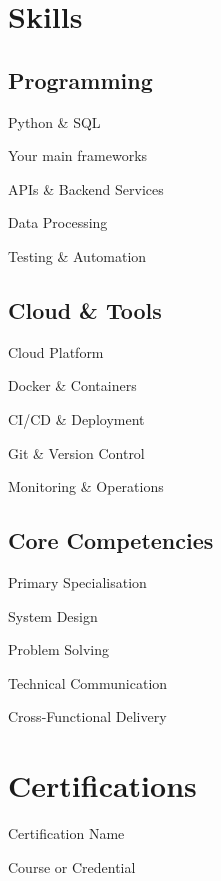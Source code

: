 \documentclass{cv}
\begin{document}
\begin{minipage}[t]{0.31\textwidth}

\section{Skills}

\subsection{Programming}
\begin{tightemize}
  \item Python \& SQL
  \item Your main frameworks
  \item APIs \& Backend Services
  \item Data Processing
  \item Testing \& Automation
\end{tightemize}

\entrysep

\subsection{Cloud \& Tools}
\begin{tightemize}
  \item Cloud Platform
  \item Docker \& Containers
  \item CI/CD \& Deployment
  \item Git \& Version Control
  \item Monitoring \& Operations
\end{tightemize}

\entrysep

\subsection{Core Competencies}
\begin{tightemize}
  \item Primary Specialisation
  \item System Design
  \item Problem Solving
  \item Technical Communication
  \item Cross-Functional Delivery
\end{tightemize}

\section{Certifications}
\begin{tightemize}
  \item Certification Name
  \item Course or Credential
\end{tightemize}


\end{minipage}
\end{document}
